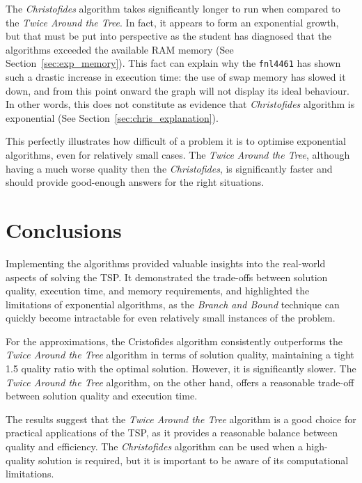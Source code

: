 \documentclass[12pt]{article}
\begin{document}
The \textit{Christofides} algorithm takes significantly longer to run when compared to the \textit{Twice Around the Tree}. 
In fact, it appears to form an exponential growth, but that must be put into perspective as the student 
has diagnosed that the algorithms exceeded the available RAM memory (See Section~\ref{sec:exp_memory}). 
This fact can explain why the \texttt{fnl4461} has shown such a drastic increase in execution time: the use 
of swap memory has slowed it down, and from this point onward the graph will not display its ideal behaviour. In 
other words, this does not constitute as evidence that \textit{Christofides} algorithm is exponential 
(See Section~\ref{sec:chris_explanation}).

This perfectly illustrates how difficult of a problem it is to optimise exponential algorithms, even for relatively 
small cases. The \textit{Twice Around the Tree}, although having a much worse quality then the \textit{Christofides}, is 
significantly faster and should provide good-enough answers for the right situations.

\section{Conclusions} \label{sec:conclusions}

Implementing the algorithms provided valuable insights into the real-world aspects of solving the TSP. 
It demonstrated the trade-offs between solution quality, execution time, and memory requirements, 
and highlighted the limitations of exponential algorithms, as the \textit{Branch and Bound} technique can 
quickly become intractable for even relatively small instances of the problem.

For the approximations, the Cristofides algorithm consistently outperforms the \textit{Twice Around the Tree} 
algorithm in terms of solution quality, maintaining a tight 1.5 quality ratio with the optimal 
solution. However, it is significantly slower. The \textit{Twice Around the Tree} algorithm, on the other hand, 
offers a reasonable trade-off between solution quality and execution time.

The results suggest that the \textit{Twice Around the Tree} algorithm is a good choice for practical applications of the 
TSP, as it provides a reasonable balance between quality and efficiency. The \textit{Christofides} algorithm can be used 
when a high-quality solution is required, but it is important to be aware of its computational limitations.



\end{document}
